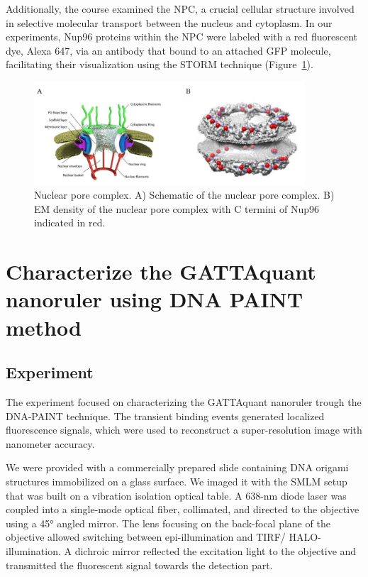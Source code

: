 \documentclass[a4paper,english,12pt,bibliography=totoc]{scrreprt}
\begin{document}
    


Additionally, the course examined the NPC, a crucial cellular structure involved in selective molecular transport between the nucleus and cytoplasm. In our experiments, Nup96 proteins within the NPC were labeled with a red fluorescent dye, Alexa 647, via an antibody that bound to an attached GFP molecule, facilitating their visualization using the STORM technique (Figure~\ref{fig:comples}).

\begin{figure}[h]
    \centering
    \includegraphics[width=0.9\textwidth]{ncp.png}
    \caption{Nuclear pore complex. A) Schematic of the nuclear pore complex. B) EM density of the nuclear pore complex with C termini of Nup96 indicated in red. \cite{Thevathasan2019}}
    \label{fig:comples}
\end{figure}

\chapter{Characterize the GATTAquant nanoruler using DNA PAINT method}

\section{Experiment}
The experiment focused on characterizing the GATTAquant nanoruler trough the DNA-PAINT technique. The transient binding events generated localized fluorescence signals, which were used to reconstruct a super-resolution image with nanometer accuracy.

We were provided with a commercially prepared slide containing DNA origami structures immobilized on a glass surface. We imaged it with the SMLM setup  that was built on a vibration isolation optical table.
A 638-nm diode laser was coupled into a single-mode optical fiber, collimated, and directed to the objective using a 45° angled mirror. The lens focusing on the back-focal plane of the objective allowed switching between epi-illumination and TIRF/ HALO-illumination. A dichroic mirror reflected the excitation light to the objective and transmitted the fluorescent signal towards the detection part.
\end{document}
